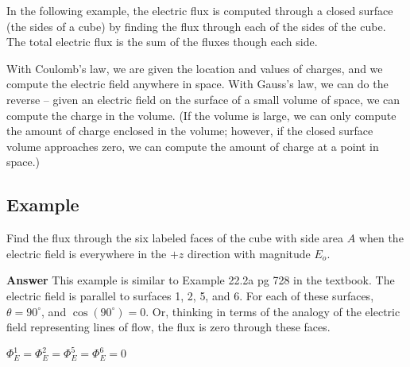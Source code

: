 \documentclass{article}
\begin{document}
In the following example, the electric flux is computed through a closed surface (the sides of a cube) by finding the flux through each of the sides of the cube. The total electric flux is the sum of the fluxes though each side.


With Coulomb's law, we are given the location and values of charges, and we compute the electric field anywhere in space. With Gauss's law, we can do the reverse -- given an electric field on the surface of a small volume of space, we can compute the charge in the volume. (If the volume is large, we can only compute the amount of charge enclosed in the volume; however, if the closed surface volume approaches zero, we can compute the amount of charge at a point in space.)

\subsection{Example}



Find the flux through the six labeled faces of the cube with side area $A$ when the electric field is everywhere in the $+z$ direction with magnitude $E_o$.

{\bf Answer} This example is similar to Example 22.2a pg 728 in the textbook. The electric field is parallel to surfaces 1, 2, 5, and 6. For each of these surfaces, $\theta=90^\circ$, and $\cos( 90^\circ)=0$. Or, thinking in terms of the analogy of the electric field representing lines of flow, the flux is zero through these faces. 



$\Phi_E^{1}=\Phi_E^{2}=\Phi_E^{5}=\Phi_E^{6}=0$
\end{document}
